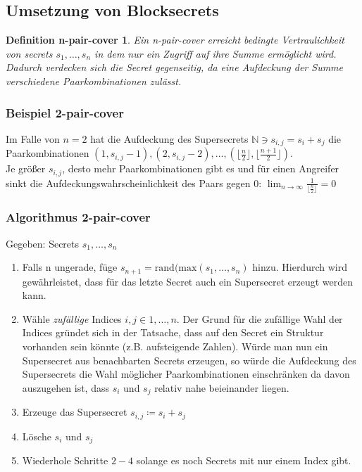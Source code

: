 \documentclass[12pt,a4paper]{scrartcl}
\begin{document}
\newpage

\subsection*{Umsetzung von Blocksecrets}
\newtheorem{npg}{Definition n-pair-cover}
\begin{npg}
	Ein n-pair-cover erreicht bedingte Vertraulichkeit von secrets $s_1,\ldots, s_n$ in dem nur ein Zugriff auf ihre Summe ermöglicht wird. Dadurch verdecken sich die Secret gegenseitig, da eine Aufdeckung der Summe verschiedene Paarkombinationen zulässt.
\end{npg}	
	
\subsubsection*{Beispiel 2-pair-cover}
	Im Falle von $n=2$ hat die Aufdeckung des Supersecrets $\mathbb{N}\ni  s_{i,j} = s_i+s_j$ die Paarkombinationen $(1,s_{i,j}-1),(2, s_{i,j}-2),\ldots,(\lfloor\frac{n}{2} \rfloor,\lfloor\frac{n+1}{2} \rfloor)$.\\
	Je größer $s_{i,j}$, desto mehr Paarkombinationen gibt es und für einen Angreifer sinkt die Aufdeckungswahrscheinlichkeit des Paars gegen $0$: $\lim_{n\to\infty}\frac{1}{\lfloor\frac{n}{2} \rfloor}=0$

\subsubsection*{Algorithmus 2-pair-cover}
Gegeben: Secrets $s_1,\ldots,s_n$
\begin{enumerate}
	\item
	Falls n ungerade, füge $s_{n+1}= \text{rand}(\text{max}({s_1,\ldots,s_n})$ hinzu. Hierdurch wird gewährleistet, dass für das letzte Secret auch ein Supersecret erzeugt werden kann.
	
	\item 
	Wähle \textit{zufällige} Indices $i,j \in {1,\ldots,n}$. Der Grund für die zufällige Wahl der Indices gründet sich in der Tatsache, dass auf den Secret ein Struktur vorhanden sein könnte (z.B. aufsteigende Zahlen). Würde man nun ein Supersecret aus benachbarten Secrets erzeugen, so würde die Aufdeckung des Supersecrets die Wahl möglicher Paarkombinationen einschränken da davon auszugehen ist, dass $s_i$ und $s_j$ relativ nahe beieinander liegen.
	
	\item
	Erzeuge das Supersecret $s_{i,j} \coloneqq s_i+s_j$
	
	\item
	Lösche $s_i$ und $s_j$
	
	\item
	Wiederhole Schritte $2-4$ solange es noch Secrets mit nur einem Index gibt.
		
\end{enumerate}\
\end{document}
